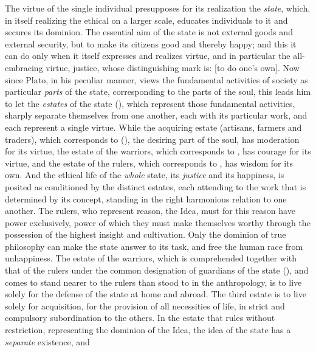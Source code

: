 The virtue of the single individual presupposes for its realization the \emph{state}, which, in itself realizing the ethical on
a larger scale, educates individuals to it and secures
its dominion. The essential aim of the state is not external
goods and external security, but to make its citizens
good and thereby happy; and this it can do only when it
itself expresses and realizes virtue, and in particular the all-embracing virtue, justice, whose distinguishing mark is: 
 [to do one's own]. Now since Plato, in his peculiar manner, views the fundamental activities of society as particular \emph{parts} of
the state, corresponding to the parts of the soul, this leads him to let
the \emph{estates} of the state (), which represent those fundamental activities, sharply separate themselves from one another, each with its particular work, and each represent a single virtue. While
the acquiring estate (artisans, farmers and traders), which corresponds to  (), the
desiring part of the soul, has moderation for its virtue, the estate of the warriors, which corresponds to , has courage for its virtue, and the estate of the rulers, which corresponds to ,
has wisdom for its own. And the ethical life of the \emph{whole} state, its \emph{justice} and its happiness, is posited as conditioned by the
distinct estates, each attending to the work that is determined by its concept, standing in the right harmonious relation
to one another.
The rulers, who represent reason,
the Idea, must for this reason have power exclusively, power of which they must make themselves worthy through the possession of the highest
insight and cultivation.
Only the dominion of true philosophy
can make the state answer to its task, and free the human race from unhappiness. The estate of the warriors, which is comprehended
together with that of the rulers under the common designation of guardians of the state
(), and comes to stand nearer to the rulers than
 stood to  in the anthropology, is to live solely for
the defense of the state at home and abroad. The third estate is to
live solely for acquisition, for the provision of all necessities of life, in strict and compulsory subordination to the others.
In the estate that rules without restriction, representing the dominion of the Idea, the idea of the state has a \emph{separate} existence, and
